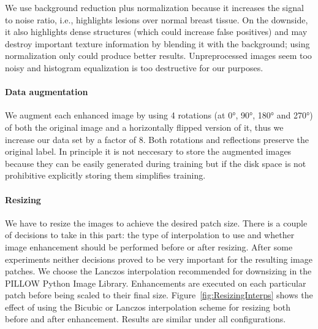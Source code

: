 We use background reduction plus normalization because it increases the signal to noise ratio, i.e., highlights lesions over normal breast tissue. On the downside, it also highlights dense structures (which could increase false positives) and may destroy important texture information by blending it with the background; using normalization only could produce better results. Unpreprocessed images seem too noisy and histogram equalization is too destructive for our purposes.

\paragraph{Data augmentation}
We augment each enhanced image by using 4 rotations (at 0°, 90°, 180° and 270°) of both the original image and a horizontally flipped version of it, thus we increase our data set by a factor of 8. Both rotations and reflections preserve the original label. In principle it is not neccesary to store the augmented images because they can be easily generated during training but if the disk space is not prohibitive explicitly storing them simplifies training.


\paragraph{Resizing}
We have to resize the images to achieve the desired patch size. There is a couple of decisions to take in this part: the type of interpolation to use and whether image enhancement should be performed before or after resizing. After some experiments neither decisions proved to be very important for the resulting image patches. We choose the Lanczos interpolation recommended for downsizing in the PILLOW Python Image Library. Enhancements are executed on each particular patch before being scaled to their final size. Figure~\ref{fig:ResizingInterps} shows the effect of using the Bicubic or Lanczos interpolation scheme for resizing both before and after enhancement. Results are similar under all configurations.

